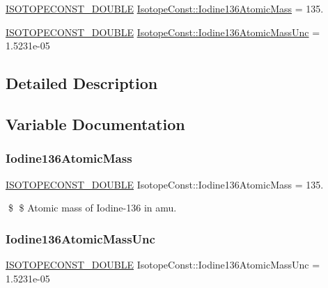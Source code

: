\begin{DoxyCompactItemize}
\item 
\mbox{\hyperlink{group___isotope_const-_macros_ga8f45a7272ce02c0b4c65c44636ed719a}{I\+S\+O\+T\+O\+P\+E\+C\+O\+N\+S\+T\+\_\+\+D\+O\+U\+B\+LE}} \mbox{\hyperlink{group___isotope_const-_iodine-_i136_gaf239b5f440f3634433e11f4fef73f1c7}{Isotope\+Const\+::\+Iodine136\+Atomic\+Mass}} = 135.
\item 
\mbox{\hyperlink{group___isotope_const-_macros_ga8f45a7272ce02c0b4c65c44636ed719a}{I\+S\+O\+T\+O\+P\+E\+C\+O\+N\+S\+T\+\_\+\+D\+O\+U\+B\+LE}} \mbox{\hyperlink{group___isotope_const-_iodine-_i136_ga4fe47966670b7443d2604eecd852cff8}{Isotope\+Const\+::\+Iodine136\+Atomic\+Mass\+Unc}} = 1.\+5231e-\/05
\end{DoxyCompactItemize}


\subsection{Detailed Description}


\subsection{Variable Documentation}
\mbox{\label{group___isotope_const-_iodine-_i136_gaf239b5f440f3634433e11f4fef73f1c7}} 
\subsubsection{\texorpdfstring{Iodine136\+Atomic\+Mass}{Iodine136AtomicMass}}
{\footnotesize\ttfamily \mbox{\hyperlink{group___isotope_const-_macros_ga8f45a7272ce02c0b4c65c44636ed719a}{I\+S\+O\+T\+O\+P\+E\+C\+O\+N\+S\+T\+\_\+\+D\+O\+U\+B\+LE}} Isotope\+Const\+::\+Iodine136\+Atomic\+Mass = 135.}

\$ \$ Atomic mass of Iodine-\/136 in amu. \mbox{\label{group___isotope_const-_iodine-_i136_ga4fe47966670b7443d2604eecd852cff8}} 
\subsubsection{\texorpdfstring{Iodine136\+Atomic\+Mass\+Unc}{Iodine136AtomicMassUnc}}
{\footnotesize\ttfamily \mbox{\hyperlink{group___isotope_const-_macros_ga8f45a7272ce02c0b4c65c44636ed719a}{I\+S\+O\+T\+O\+P\+E\+C\+O\+N\+S\+T\+\_\+\+D\+O\+U\+B\+LE}} Isotope\+Const\+::\+Iodine136\+Atomic\+Mass\+Unc = 1.\+5231e-\/05}

